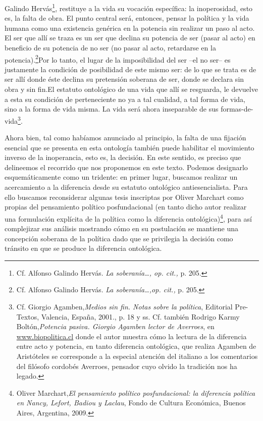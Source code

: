Galindo Hervás\footnote{Cf. Alfonso Galindo Hervás. \emph{La
  soberanía\ldots, op. cit.,} p. 205.}, restituye a la vida su vocación
específica: la inoperosidad, esto es, la falta de obra. El punto central
será, entonces, pensar la política y la vida humana como una existencia
genérica en la potencia sin realizar un paso al acto. El ser que allí se
traza es un ser que declina su potencia de ser (pasar al acto) en
beneficio de su potencia de no ser (no pasar al acto, retardarse en la
potencia).\footnote{Cf. Alfonso Galindo Hervás. \emph{La
  soberanía\ldots,op. cit.,} p. 205.}Por lo tanto, el lugar de la
imposibilidad del ser --el no ser-- es justamente la condición de
posibilidad de este mismo ser: de lo que se trata es de ser allí donde
éste declina su pretensión soberana de ser, donde se declara sin obra y
sin fin.El estatuto ontológico de una vida que allí se resguarda, le
devuelve a esta su condición de perteneciente no ya a tal cualidad, a
tal forma de vida, sino a la forma de vida misma. La vida será ahora
inseparable de sus formas-de-vida\footnote{Cf. Giorgio
  Agamben,\emph{Medios sin fin. Notas sobre la política}, Editorial
  Pre-Textos, Valencia, España, 2001., p. 18 y ss. Cf. también Rodrigo
  Karmy Boltón,\emph{Potencia pasiva. Giorgio Agamben lector de
  Averroes}, en \href{http://www.biopolitica.cl/}{www.biopolitica.cl}
  donde el autor muestra cómo la lectura de la diferencia entre acto y
  potencia, en tanto diferencia ontológica, que realiza Agamben de
  Aristóteles se corresponde a la especial atención del italiano a los
  comentarios del filósofo cordobés Averroes, pensador cuyo olvido la
  tradición nos ha legado.}.

Ahora bien, tal como habíamos anunciado al principio, la falta de una
fijación esencial que se presenta en esta ontología también puede
habilitar el movimiento inverso de la inoperancia, esto es, la decisión.
En este sentido, es preciso que delineemos el recorrido que nos
proponemos en este texto. Podemos designarlo esquemáticamente como un
tridente: en primer lugar, buscamos realizar un acercamiento a la
diferencia desde su estatuto ontológico antiesencialista. Para ello
buscamos reconsiderar algunas tesis inscriptas por Oliver Marchart como
propias del pensamiento político posfundacional (en tanto dicho autor
realizar una formulación explícita de la política como la diferencia
ontológica)\footnote{Oliver Marchart,\emph{El pensamiento político
  posfundacional: la diferencia política en Nancy, Lefort, Badiou y
  Laclau}, Fondo de Cultura Económica, Buenos Aires, Argentina, 2009.},
para así complejizar sus análisis mostrando cómo en su postulación se
mantiene una concepción soberana de la política dado que se privilegia
la decisión como tránsito en que se produce la diferencia ontológica.

